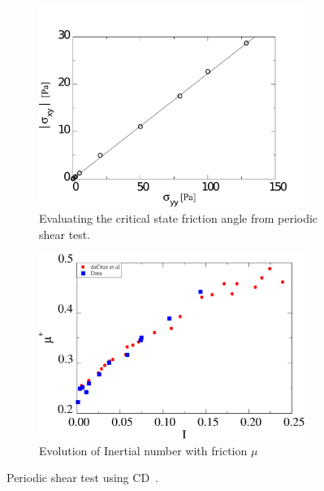 \begin{figure}[tbhp]
\centering
\begin{subfigure}[t]{0.475\textwidth}
\includegraphics[width=0.95\textwidth]{Sxy_vs_Syy_Slope}
\caption{Evaluating the critical state friction angle from periodic shear 
test.}
\label{fig:Sxy_vs_Syy_Slope}
\end{subfigure}
%
\begin{subfigure}[t]{0.475\textwidth}
\includegraphics[width=0.95\textwidth]{mu_vs_I}
\caption{Evolution of Inertial number with friction $\mu$}
\label{fig:mu_vs_I}
\end{subfigure}
\caption{Periodic shear test using CD~\citep{Mutabaruka2013}.}
\label{fig:Shear_Test_Slope}
\end{figure}


